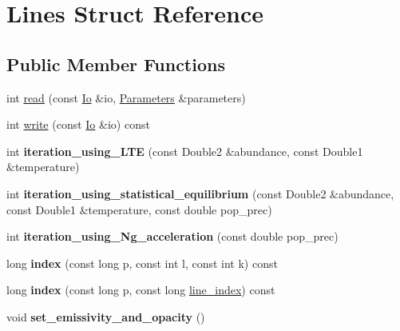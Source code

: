 \hypertarget{structLines}{}\section{Lines Struct Reference}
\label{structLines}
\subsection*{Public Member Functions}
\begin{DoxyCompactItemize}
\item 
int \mbox{\hyperlink{structLines_a49df41a4611ab3504240e9b6714a2d8c}{read}} (const \mbox{\hyperlink{structIo}{Io}} \&io, \mbox{\hyperlink{classParameters}{Parameters}} \&parameters)
\item 
int \mbox{\hyperlink{structLines_aa9400de12f5a5674743190766608b268}{write}} (const \mbox{\hyperlink{structIo}{Io}} \&io) const
\item 
\mbox{\label{structLines_a7cfb0be6ab6f2b0addfea206918b2172}} 
int {\bfseries iteration\+\_\+using\+\_\+\+L\+TE} (const Double2 \&abundance, const Double1 \&temperature)
\item 
\mbox{\label{structLines_afff2e68f179f5c2f03ff36ff93b53e0a}} 
int {\bfseries iteration\+\_\+using\+\_\+statistical\+\_\+equilibrium} (const Double2 \&abundance, const Double1 \&temperature, const double pop\+\_\+prec)
\item 
\mbox{\label{structLines_a68f4d951b85233d09c5f079e66458190}} 
int {\bfseries iteration\+\_\+using\+\_\+\+Ng\+\_\+acceleration} (const double pop\+\_\+prec)
\item 
\mbox{\label{structLines_a13a0899ce002a1f703ba120d300b887b}} 
long {\bfseries index} (const long p, const int l, const int k) const
\item 
\mbox{\label{structLines_ae59044a1cb509d074af2449f64dba80a}} 
long {\bfseries index} (const long p, const long \mbox{\hyperlink{structLines_aec3fe598ca48779b70a16219871ec98d}{line\+\_\+index}}) const
\item 
\mbox{\label{structLines_aaa0b4d40e79b6d3729f190a7d77a36a2}} 
void {\bfseries set\+\_\+emissivity\+\_\+and\+\_\+opacity} ()
\item 

\end{DoxyCompactItemize}
